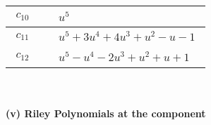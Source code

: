\documentclass[1p]{elsarticle_modified}
\theoremstyle{definition}
\begin{document}
\begin{tabular}{m{50pt}|m{274pt}}
\hline $$\begin{aligned}c_{10}\end{aligned}$$&$\begin{aligned}
&u^5
\end{aligned}$\\
\hline $$\begin{aligned}c_{11}\end{aligned}$$&$\begin{aligned}
&u^5+3 u^4+4 u^3+u^2- u-1
\end{aligned}$\\
\hline $$\begin{aligned}c_{12}\end{aligned}$$&$\begin{aligned}
&u^5- u^4-2 u^3+u^2+u+1
\end{aligned}$\\
\hline
\end{tabular}\\~\\
\newpage\renewcommand{\arraystretch}{1}
\flushleft \textbf{(v) Riley Polynomials at the component}\newline \\
\end{document}
